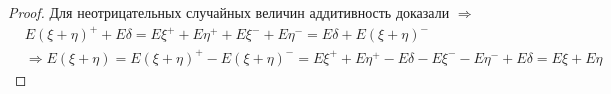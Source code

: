 \begin{enumerate}[label=\protect\circled{\arabic*},series=mean_properties]
\begin{proof}
      Для неотрицательных случайных величин аддитивность доказали $\Rightarrow$
      \begin{align*}
        &E (\xi + \eta)^+ + E \delta = E \xi^+ + E \eta^+ + E \xi^- + E \eta^- =
        E \delta + E (\xi + \eta)^-\\
        &\Rightarrow E (\xi + \eta) = E (\xi + \eta)^+ - E (\xi + \eta)^- = 
        E \xi^+ + E \eta^+ -E \delta - E \xi^- - E \eta^- + E \delta = E \xi + E \eta
      \end{align*} 

    \end{proof}

\end{enumerate}


